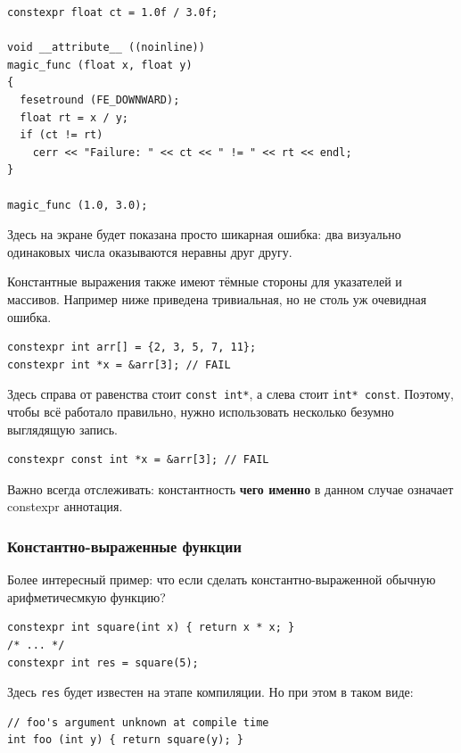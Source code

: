 \documentclass[a4paper,12pt,oneside]{article}
\begin{document}
\begin{lstlisting}
constexpr float ct = 1.0f / 3.0f;

void __attribute__ ((noinline))
magic_func (float x, float y)
{
  fesetround (FE_DOWNWARD);
  float rt = x / y;
  if (ct != rt) 
    cerr << "Failure: " << ct << " != " << rt << endl;  
}

magic_func (1.0, 3.0);
\end{lstlisting}

Здесь на экране будет показана просто шикарная ошибка: два визуально одинаковых числа оказываются неравны друг другу.

Константные выражения также имеют тёмные стороны для указателей и массивов. Например ниже приведена тривиальная, но не столь уж очевидная ошибка.

\begin{lstlisting}
constexpr int arr[] = {2, 3, 5, 7, 11};
constexpr int *x = &arr[3]; // FAIL
\end{lstlisting}

Здесь справа от равенства стоит \lstinline!const int*!, а слева стоит \lstinline!int* const!. Поэтому, чтобы всё работало правильно, нужно использовать несколько безумно выглядящую запись.

\begin{lstlisting}
constexpr const int *x = &arr[3]; // FAIL
\end{lstlisting}

Важно всегда отслеживать: константность \textbf{чего именно} в данном случае означает constexpr аннотация.

\subsubsection{Константно-выраженные функции}\label{Constexpr:functions}

Более интересный пример: что если сделать константно-выраженной обычную арифметичесмкую функцию?

\begin{lstlisting}
constexpr int square(int x) { return x * x; }
/* ... */
constexpr int res = square(5);
\end{lstlisting}

Здесь \lstinline!res! будет известен на этапе компиляции. Но при этом в таком виде:

\begin{lstlisting}
// foo's argument unknown at compile time
int foo (int y) { return square(y); }
\end{lstlisting}
\end{document}
